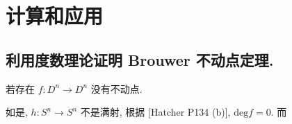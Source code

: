 \section{计算和应用}

\subsection{利用度数理论证明 Brouwer 不动点定理.} %

若存在 $f\colon D^n \rightarrow D^n$ 没有不动点. 

如是, $h\colon S^n \rightarrow S^n$ 不是满射, 根据 [Hatcher P134 (b)], $\mathrm{deg} f = 0$. 而  


